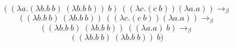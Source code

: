 \documentclass[12pt]{article}
\begin{document}
\Large
$$((\lambda a.(\lambda b.b\ b)\ (\lambda b.b\ b))\ b)\ ((\lambda c.(c\ b))(\lambda a.a))\to_\beta$$
$$((\lambda b.b\ b)\ (\lambda b.b\ b))\ ((\lambda c.(c\ b))(\lambda a.a))\to_\beta$$
$$((\lambda b.b\ b)\ (\lambda b.b\ b))\ ((\lambda a.a)\ b)\to_\beta$$
$$((\lambda b.b\ b)\ (\lambda b.b\ b))\ b)$$
\end{document}
